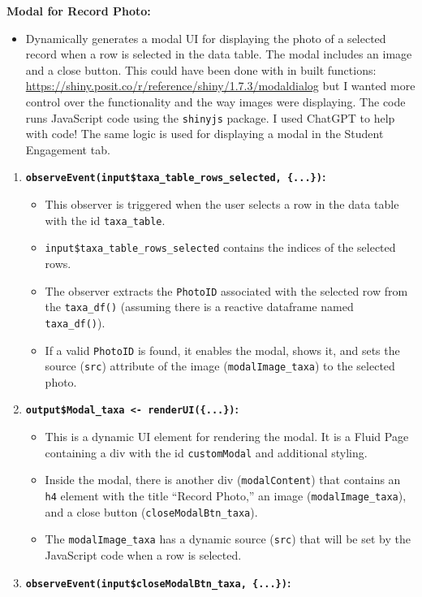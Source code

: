 \documentclass[
]{book}
\providecommand{\tightlist}{%
  \setlength{\itemsep}{0pt}\setlength{\parskip}{0pt}}
\begin{document}
\textbf{Modal for Record Photo:}

\begin{itemize}
\tightlist
\item
  Dynamically generates a modal UI for displaying the photo of a selected record when a row is selected in the data table. The modal includes an image and a close button. This could have been done with in built functions: \url{https://shiny.posit.co/r/reference/shiny/1.7.3/modaldialog} but I wanted more control over the functionality and the way images were displaying. The code runs JavaScript code using the \texttt{shinyjs} package. I used ChatGPT to help with code! The same logic is used for displaying a modal in the Student Engagement tab.
\end{itemize}

\begin{enumerate}
\def\labelenumi{\arabic{enumi}.}
\tightlist
\item
  \textbf{\texttt{observeEvent(input\$taxa\_table\_rows\_selected,\ \{...\})}:}

  \begin{itemize}
  \tightlist
  \item
    This observer is triggered when the user selects a row in the data table with the id \texttt{taxa\_table}.
  \item
    \texttt{input\$taxa\_table\_rows\_selected} contains the indices of the selected rows.
  \item
    The observer extracts the \texttt{PhotoID} associated with the selected row from the \texttt{taxa\_df()} (assuming there is a reactive dataframe named \texttt{taxa\_df()}).
  \item
    If a valid \texttt{PhotoID} is found, it enables the modal, shows it, and sets the source (\texttt{src}) attribute of the image (\texttt{modalImage\_taxa}) to the selected photo.
  \end{itemize}
\item
  \textbf{\texttt{output\$Modal\_taxa\ \textless{}-\ renderUI(\{...\})}:}

  \begin{itemize}
  \tightlist
  \item
    This is a dynamic UI element for rendering the modal. It is a Fluid Page containing a div with the id \texttt{customModal} and additional styling.
  \item
    Inside the modal, there is another div (\texttt{modalContent}) that contains an \texttt{h4} element with the title ``Record Photo,'' an image (\texttt{modalImage\_taxa}), and a close button (\texttt{closeModalBtn\_taxa}).
  \item
    The \texttt{modalImage\_taxa} has a dynamic source (\texttt{src}) that will be set by the JavaScript code when a row is selected.
  \end{itemize}
\item
  \textbf{\texttt{observeEvent(input\$closeModalBtn\_taxa,\ \{...\})}:}


\end{enumerate}
\end{document}
